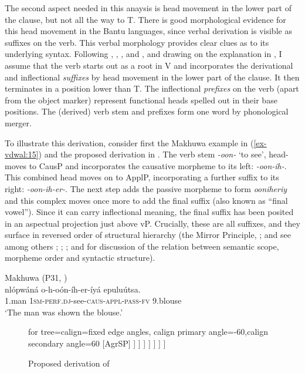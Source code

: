 \documentclass[output=paper
,modfonts
,nonflat]{langsci/langscibook}
\begin{document}
The second aspect needed in this anaysis is head movement in the lower part of the clause, but not all the way to T. There is good morphological evidence for this head movement in the Bantu languages, since verbal derivation is visible as suffixes on the verb. This verbal morphology provides clear clues as to its underlying syntax. Following \citet{Myers1990}, \citet{Julien2002}, \citet{Kinyalolo2003}, and \citet{Buell2005}, and drawing on the explanation in \citet{Van_der_Wal2009}, I assume that the verb starts out as a root in V and incorporates the derivational and inflectional \textit{suffixes} by head movement in the lower part of the clause. It then terminates in a position lower than T. The inflectional \textit{prefixes} on the verb (apart from the object marker) represent functional heads spelled out in their base positions. The (derived) verb stem and prefixes form one word by phonological merger.

To illustrate this derivation, consider first the Makhuwa example in (\ref{ex-vdwal:15}) and the proposed derivation in . The verb stem \textit{-oon-} ‘to see’, head-moves to CausP and incorporates the causative morpheme to its left: \textit{-oon-ih-}. This combined head moves on to ApplP, incorporating a further suffix to its right: \textit{-oon-ih-er-}. The next step adds the passive morpheme to form \textit{ooniheriy} and this complex moves once more to add the final suffix (also known as ``final vowel''). Since it can carry inflectional meaning, the final suffix has been posited in an aspectual projection just above vP. Crucially, these are all suffixes, and they surface in reversed order of structural hierarchy (the Mirror Principle, \citealt{Baker1985, Baker1988}; and see among others \citealt{Alsina1999}; \citealt{Hyman2003}; \citealt{Good2005}; and \citealt{Muriungi2008} for discussion of the relation between semantic scope, morpheme order and syntactic structure).


\begin{exe}
\ex Makhuwa (P31, \citealt[169]{Van_der_Wal2009})\label{ex-vdwal:15}\\ 
	\gll nlópwáná o-h-oón-íh-er-íyá epuluútsa.\\
	1.man 1\textsc{sm}-\textsc{perf}.\textsc{dj}-see-\textsc{caus}-\textsc{appl}-\textsc{pass}-\textsc{fv} 9.blouse\\
	\glt `The man was shown the blouse.'
\end{exe}

\begin{figure}
\caption{Proposed derivation of \label{fig-vdwal:18}}
		\begin{forest} for tree={calign=fixed edge angles, calign primary angle=-60,calign secondary angle=60}
			[AgrSP\footnotemark
			[o-] 
			[TP 
			[-h-] 
			[AspP
			[{[} {[} {[} {[} {[} -oon{]} \textsubscript{i}ih{]}\textsubscript{j}er{]}\textsubscript{k}iy{]}\textsubscript{m}a{]}]
			[vP
			[t]
			[PassP
			[t\textsubscript{m}]
			[ApplP
			[t\textsubscript{k}]
			[CausP
			[t\textsubscript{j}]
			[VP
			[t\textsubscript{i}]
			[epuluutsa
			] ] ] ]	] ] ] ] ]			
	\end{forest}
\end{figure}
\end{document}
